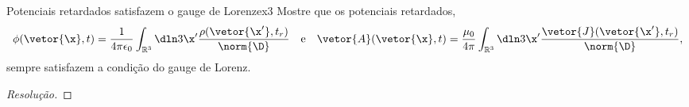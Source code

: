 \begin{exercício}{Potenciais retardados satisfazem o gauge de Lorenz}{ex3}
   Mostre que os potenciais retardados, 
   \begin{equation*}
      \phi(\vetor{\x}, t) = \frac{1}{4\pi \epsilon_0}\int_{\mathbb{R}^3} \dln3{\x'} \frac{\rho(\vetor{\x'}, t_r)}{\norm{\D}}
      \quad\text{e}\quad
      \vetor{A}(\vetor{\x},t) = \frac{\mu_0}{4\pi} \int_{\mathbb{R}^3} \dln3{\x'} \frac{\vetor{J}(\vetor{\x'}, t_r)}{\norm{\D}},
   \end{equation*}
   sempre satisfazem a condição do gauge de Lorenz.
\end{exercício}
\begin{proof}[Resolução]
    
\end{proof}
